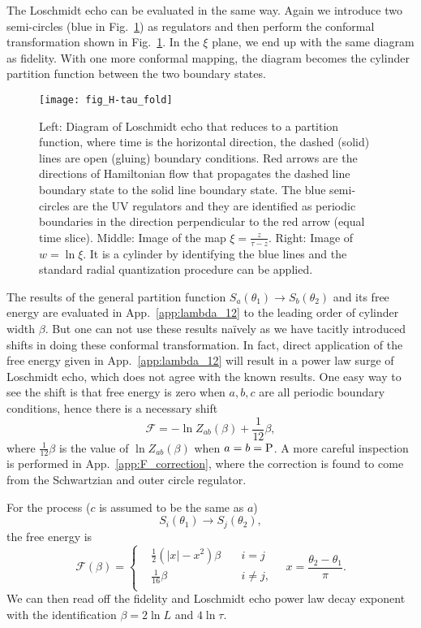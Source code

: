 The Loschmidt echo can be evaluated in the same way. Again we introduce two semi-circles (blue in Fig.~\ref{fig:H-tau_fold}) as regulators and then perform the conformal transformation shown in Fig.~\ref{fig:H-tau_fold}. In the $\xi$ plane, we end up with the same diagram as fidelity. With one more conformal mapping, the diagram becomes the cylinder partition function between the two boundary states. 

\begin{figure}[htb]
\centering
\texttt{[image: fig\_H-tau\_fold]}
\caption{Left: Diagram of Loschmidt echo that reduces to a partition function, where time is the horizontal direction, the dashed (solid) lines are open (gluing) boundary conditions. Red arrows are the directions of Hamiltonian flow that propagates the dashed line boundary state to the solid line boundary state. The blue semi-circles are the UV regulators and they are identified as periodic boundaries in the direction perpendicular to the red arrow (equal time slice). Middle: Image of the map $\xi = \frac{z}{\tau - z}$. Right: Image of $w = \ln \xi$. It is a cylinder by identifying the blue lines and the standard radial quantization procedure can be applied. }
\label{fig:H-tau_fold}
\end{figure}

The results of the general partition function $S_a( \theta_1 ) \rightarrow S_b( \theta_2)$ and its free energy are evaluated in App.~\ref{app:lambda_12} to the leading order of cylinder width $\beta$. But one can not use these results na\"ively as we have tacitly introduced shifts in doing these conformal transformation. In fact, direct application of the free energy given in App.~\ref{app:lambda_12} will result in a power law surge of Loschmidt echo, which does not agree with the known results. One easy way to see the shift is that free energy is zero when $a,b,c$ are all periodic boundary conditions, hence there is a necessary shift
\begin{equation}
\mathcal{F} = - \ln Z_{ab} ( \beta ) + \frac{1}{12} \beta ,
\end{equation}
where $\frac{1}{12}\beta$ is the value of $ \ln Z_{ab} ( \beta )$ when $a = b = {\rm P}$. A more careful inspection is performed in App.~\ref{app:F_correction}, where the correction is found to come from the Schwartzian and outer circle regulator. 

For the process ($c$ is assumed to be the same as $a$)
\begin{equation}
S_i( \theta_1 ) \rightarrow S_j( \theta_2 ) ,
\end{equation}
the free energy is
\begin{equation}
\mathcal{F}( \beta )  = 
\left\lbrace
\begin{aligned}
  &\frac{1}{2}(|x| - x^2 )\beta  \quad &i = j \\
  &\frac{1}{16}\beta   \quad &i \ne j ,  \\
\end{aligned} \right. \quad x = \frac{\theta_2 - \theta_1}{\pi} .
\end{equation}
We can then read off the fidelity and Loschmidt echo power law decay exponent with the identification $\beta = 2 \ln L$ and $ 4 \ln \tau$. 

